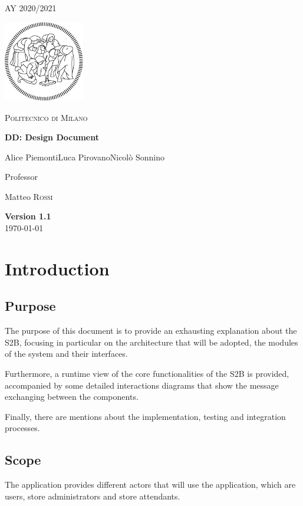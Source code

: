 \documentclass[table, 12pt]{article}
\begin{document}
\begin{titlepage}
    \centering
    {\scshape\large AY 2020/2021 \par}
    \vfill
    \includegraphics[width=100pt]{assets/logo-polimi-new}\par\vspace{1cm}
    {\scshape\LARGE Politecnico di Milano \par}
    \vspace{1.5cm}
    {\huge\bfseries DD\@: Design Document \par}
    \vspace{2cm}
    {\Large {Alice Piemonti\quad Luca Pirovano\quad Nicolò Sonnino}\par}
    \vfill
    {\large Professor\par
        Matteo \textsc{Rossi}}
    \vfill
    {\large \textbf{Version 1.1} \\ \today \par}
\end{titlepage}
\thispagestyle{plain}
\mbox{}
\newpage
{}
\tableofcontents
\newpage
{}

\section{Introduction}
\subsection{Purpose}
The purpose of this document is to provide an exhausting explanation about the S2B, focusing in particular on the architecture that will be adopted, the modules of the system and their interfaces.

Furthermore, a runtime view of the core functionalities of the S2B is provided, accompanied by some detailed interactions diagrams that show the message exchanging between the components.

Finally, there are mentions about the implementation, testing and integration processes.

\subsection{Scope}
The application provides different actors that will use the application, which are users, store administrators and store attendants.
\end{document}
